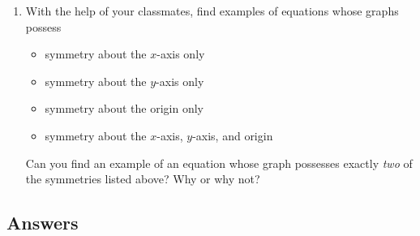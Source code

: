 \begin{enumerate}
\setcounter{enumi}{\value{HW}}

\item  With the help of your classmates, find examples of equations whose graphs possess 

\begin{itemize}

\item  symmetry about the $x$-axis only

\item  symmetry about the $y$-axis only

\item  symmetry about the origin only

\item  symmetry about the $x$-axis, $y$-axis, and origin

\end{itemize}

Can you find an example of an equation whose graph possesses exactly \textit{two} of the symmetries listed above?  Why or why not?

\end{enumerate}

\clearpage
\startexenum

\subsection{Answers}

